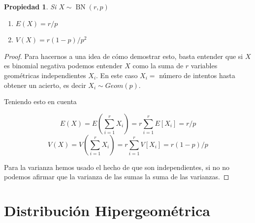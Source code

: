 \documentclass[]{book}
\theoremstyle{plain}
\newtheorem{property}[theorem]{Propiedad}
\theoremstyle{definition}
\theoremstyle{definition} %
\begin{document}
\begin{property}
  Si \(\displaystyle X\sim \operatorname {BN} (r,p)\)
  \begin{enumerate}[(1)]
    \item $E(X) = r/p$
    \item $V(X) = r(1-p)/p^2$
  \end{enumerate}
\end{property}

\begin{proof}
  Para hacernos a una idea de cómo demostrar esto, basta entender que si $X$ es binomial negativa podemos entender $X$ como la suma
  de $r$ variables geométricas independientes $X_i$. 
  En este caso $X_i = $ número de intentos hasta obtener un acierto, es decir $X_i \sim Geom (p)$.


  Teniendo esto en cuenta 

  \[E(X)= E(\sum^r_{i=1} X_i) = r \sum^r_{i=1} E[X_i] = r/p \]
  \[V(X)= V(\sum^r_{i=1} X_i) = r \sum^r_{i=1} V[X_i] = r(1-p)/p \] 

  Para la varianza hemos usado el hecho de que son independientes, si no no podemos afirmar que la varianza de las sumas 
  la suma de las varianzas.
\end{proof}

\section{Distribución Hipergeométrica} 
\end{document}
